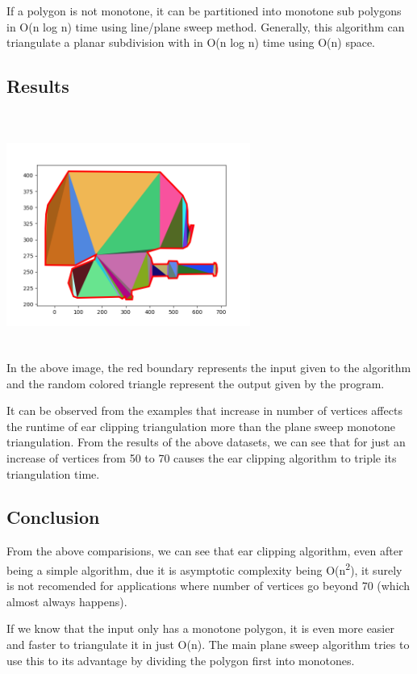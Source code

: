 If a polygon is not monotone, it can be partitioned into monotone sub
polygons in O(n log n) time using line/plane sweep method. Generally,
this algorithm can triangulate a planar subdivision with in O(n log n)
time using O(n) space.

\hypertarget{results}{%
\subsection{Results}\label{results}}

\includegraphics[width=8cm,height=8cm]{img/TRItank.png}\\

In the above image, the red boundary represents the input given to the
algorithm and the random colored triangle represent the output given by
the program.

It can be observed from the examples that increase in number of vertices
affects the runtime of ear clipping triangulation more than the plane
sweep monotone triangulation. From the results of the above datasets, we
can see that for just an increase of vertices from 50 to 70 causes the
ear clipping algorithm to triple its triangulation time.

\hypertarget{conclusion}{%
\subsection{Conclusion}\label{conclusion}}

From the above comparisions, we can see that ear clipping algorithm,
even after being a simple algorithm, due it is asymptotic complexity
being O(n\textsuperscript{2}), it surely is not recomended for
applications where number of vertices go beyond 70 (which almost always
happens).

If we know that the input only has a monotone polygon, it is even more
easier and faster to triangulate it in just O(n). The main plane sweep
algorithm tries to use this to its advantage by dividing the polygon
first into monotones.
